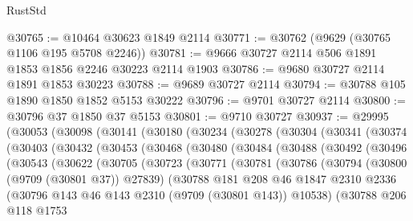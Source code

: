 \begin{lexlean}{RustStd}
\begin{coremodule}
@30765 := @10464 @30623 @1849 @2114
@30771 := @30762 (@9629 (@30765 @1106 @195 @5708 @2246))
@30781 := @9666 @30727 @2114 @506 @1891 @1853 @1856 @2246 @30223 @2114 @1903
@30786 := @9680 @30727 @2114 @1891 @1853 @30223
@30788 := @9689 @30727 @2114
@30794 := @30788 @105 @1890 @1850 @1852 @5153 @30222
@30796 := @9701 @30727 @2114
@30800 := @30796 @37 @1850 @37 @5153
@30801 := @9710 @30727
@30937 := @29995
    (@30053
      (@30098
        (@30141
          (@30180
            (@30234
              (@30278
                (@30304
                  (@30341
                    (@30374
                      (@30403
                        (@30432
                          (@30453
                            (@30468
                              (@30480
                                (@30484
                                  (@30488
                                    (@30492
                                      (@30496
                                        (@30543
                                          (@30622
                                            (@30705
                                              (@30723
                                                (@30771
                                                  (@30781
                                                    (@30786
                                                      (@30794
                                                        (@30800 (@9709 (@30801 @37)) @27839)
                                                        (@30788
                                                          @181
                                                          @208
                                                          @46
                                                          @1847
                                                          @2310
                                                          @2336
                                                          (@30796
                                                            @143
                                                            @46
                                                            @143
                                                            @2310
                                                            (@9709 (@30801 @143))
                                                            @10538)
                                                          (@30788
                                                            @206
                                                            @118
                                                            @1753

\end{coremodule}
\end{lexlean}
